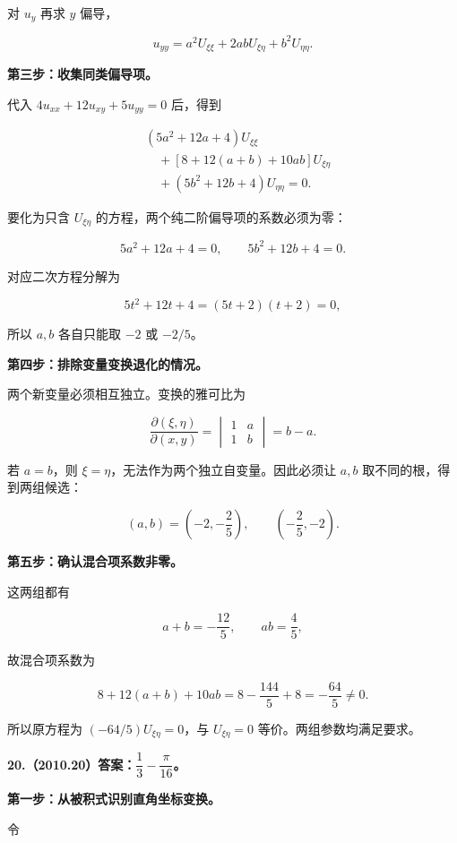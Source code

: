 \documentclass[UTF8,11pt,fontset=windows]{ctexart}
\begin{document}
对 $u_y$ 再求 $y$ 偏导，

$$
u_{yy}=a^2U_{\xi\xi}+2abU_{\xi\eta}+b^2U_{\eta\eta}.
$$

\textbf{第三步：收集同类偏导项。}

代入 $4u_{xx}+12u_{xy}+5u_{yy}=0$ 后，得到

$$
\begin{aligned}
&(5a^2+12a+4)U_{\xi\xi}\\
&\quad+[8+12(a+b)+10ab]U_{\xi\eta}\\
&\quad+(5b^2+12b+4)U_{\eta\eta}=0.
\end{aligned}
$$

要化为只含 $U_{\xi\eta}$ 的方程，两个纯二阶偏导项的系数必须为零：

$$
5a^2+12a+4=0,
\qquad5b^2+12b+4=0.
$$

对应二次方程分解为

$$
5t^2+12t+4=(5t+2)(t+2)=0,
$$

所以 $a,b$ 各自只能取 $-2$ 或 $-2/5$。

\textbf{第四步：排除变量变换退化的情况。}

两个新变量必须相互独立。变换的雅可比为

$$
\frac{\partial(\xi,\eta)}{\partial(x,y)}
=\begin{vmatrix}1&a\\1&b\end{vmatrix}=b-a.
$$

若 $a=b$，则 $\xi=\eta$，无法作为两个独立自变量。因此必须让 $a,b$ 取不同的根，得到两组候选：

$$
(a,b)=\left(-2,-\frac25\right),
\qquad\left(-\frac25,-2\right).
$$

\textbf{第五步：确认混合项系数非零。}

这两组都有

$$
a+b=-\frac{12}{5},\qquad ab=\frac45,
$$

故混合项系数为

$$
8+12(a+b)+10ab
=8-\frac{144}{5}+8=-\frac{64}{5}\ne0.
$$

所以原方程为 $(-64/5)U_{\xi\eta}=0$，与 $U_{\xi\eta}=0$ 等价。两组参数均满足要求。

\clearpage

\textbf{20.（2010.20）答案：$\dfrac13-\dfrac\pi{16}$。}

\textbf{第一步：从被积式识别直角坐标变换。}

令
\end{document}

